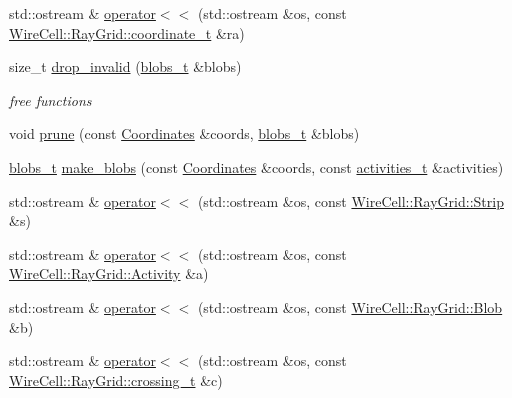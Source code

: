 \begin{DoxyCompactItemize}
\item 
std\+::ostream \& \hyperlink{namespace_wire_cell_1_1_ray_grid_a345bd1e2da7956f3bc4740cded096200}{operator$<$$<$} (std\+::ostream \&os, const \hyperlink{struct_wire_cell_1_1_ray_grid_1_1coordinate__t}{Wire\+Cell\+::\+Ray\+Grid\+::coordinate\+\_\+t} \&ra)
\item 
size\+\_\+t \hyperlink{namespace_wire_cell_1_1_ray_grid_a11febee1f22df148439d0782ffb754f4}{drop\+\_\+invalid} (\hyperlink{namespace_wire_cell_1_1_ray_grid_aea2069aff62790df3241ee7446e81ade}{blobs\+\_\+t} \&blobs)
\begin{DoxyCompactList}\small\item\em free functions \end{DoxyCompactList}\item 
void \hyperlink{namespace_wire_cell_1_1_ray_grid_a7d64051adfd2d6d4b1264d7efd841439}{prune} (const \hyperlink{class_wire_cell_1_1_ray_grid_1_1_coordinates}{Coordinates} \&coords, \hyperlink{namespace_wire_cell_1_1_ray_grid_aea2069aff62790df3241ee7446e81ade}{blobs\+\_\+t} \&blobs)
\item 
\hyperlink{namespace_wire_cell_1_1_ray_grid_aea2069aff62790df3241ee7446e81ade}{blobs\+\_\+t} \hyperlink{namespace_wire_cell_1_1_ray_grid_a096e166d076b5ecaec0412ebb7f54f9e}{make\+\_\+blobs} (const \hyperlink{class_wire_cell_1_1_ray_grid_1_1_coordinates}{Coordinates} \&coords, const \hyperlink{namespace_wire_cell_1_1_ray_grid_af748d1ae6bed1a329eb9f14dd11e2873}{activities\+\_\+t} \&activities)
\item 
std\+::ostream \& \hyperlink{namespace_wire_cell_1_1_ray_grid_a48ccf389e7999daf1e79ba27c68b6752}{operator$<$$<$} (std\+::ostream \&os, const \hyperlink{struct_wire_cell_1_1_ray_grid_1_1_strip}{Wire\+Cell\+::\+Ray\+Grid\+::\+Strip} \&s)
\item 
std\+::ostream \& \hyperlink{namespace_wire_cell_1_1_ray_grid_ab7bb8eba0ead6662043107193ad27361}{operator$<$$<$} (std\+::ostream \&os, const \hyperlink{class_wire_cell_1_1_ray_grid_1_1_activity}{Wire\+Cell\+::\+Ray\+Grid\+::\+Activity} \&a)
\item 
std\+::ostream \& \hyperlink{namespace_wire_cell_1_1_ray_grid_ae5aa7f167da146b7a3c08802424cdd4a}{operator$<$$<$} (std\+::ostream \&os, const \hyperlink{class_wire_cell_1_1_ray_grid_1_1_blob}{Wire\+Cell\+::\+Ray\+Grid\+::\+Blob} \&b)
\item 
std\+::ostream \& \hyperlink{namespace_wire_cell_1_1_ray_grid_aded39a1d915d9ecee3596351f1042d16}{operator$<$$<$} (std\+::ostream \&os, const \hyperlink{namespace_wire_cell_1_1_ray_grid_ad8870c962588c4492b1f7c5ad1552a7e}{Wire\+Cell\+::\+Ray\+Grid\+::crossing\+\_\+t} \&c)
\end{DoxyCompactItemize}


